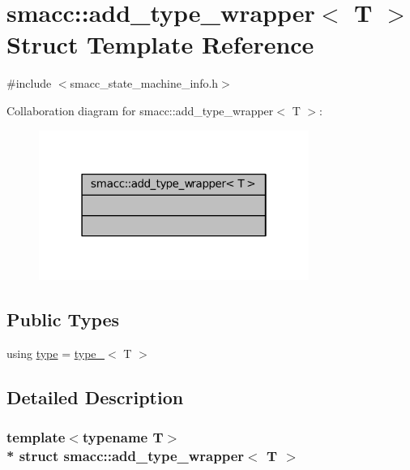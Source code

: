 \hypertarget{structsmacc_1_1add__type__wrapper}{}\section{smacc\+:\+:add\+\_\+type\+\_\+wrapper$<$ T $>$ Struct Template Reference}
\label{structsmacc_1_1add__type__wrapper}


{\ttfamily \#include $<$smacc\+\_\+state\+\_\+machine\+\_\+info.\+h$>$}



Collaboration diagram for smacc\+:\+:add\+\_\+type\+\_\+wrapper$<$ T $>$\+:
\nopagebreak
\begin{figure}[H]
\begin{center}
\leavevmode
\includegraphics[width=250pt]{structsmacc_1_1add__type__wrapper__coll__graph}
\end{center}
\end{figure}
\subsection*{Public Types}
\begin{DoxyCompactItemize}
\item 
using \hyperlink{structsmacc_1_1add__type__wrapper_a3e5af90e35b5a70d9c4d952ef8011da9}{type} = \hyperlink{structsmacc_1_1type__}{type\+\_\+}$<$ T $>$
\end{DoxyCompactItemize}


\subsection{Detailed Description}
\subsubsection*{template$<$typename T$>$\\*
struct smacc\+::add\+\_\+type\+\_\+wrapper$<$ T $>$}



